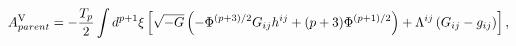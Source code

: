 \begin{equation}
A^{{\rm V}}_{parent}=-\frac{T_p}{2}\int d^{p+1}{\xi}\left[\sqrt{-G}
\left(-{\Phi}^{(p+3)/2}G_{ij}h^{ij}+(p+3){\Phi}^{(p+1)/2}\right)
+{\Lambda}^{ij}\left(G_{ij}-g_{ij}\right)\right],
\end{equation}

